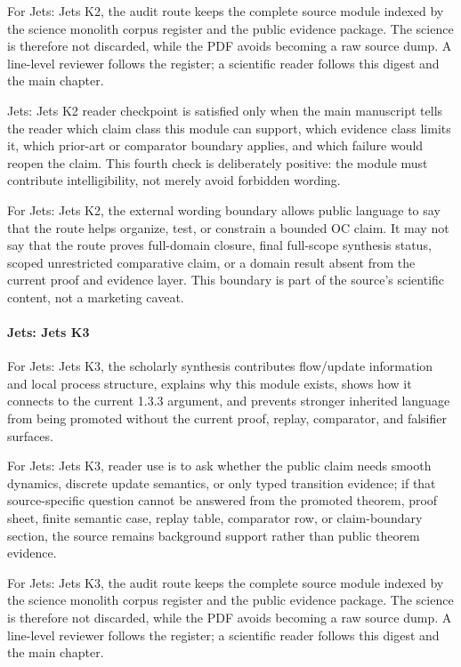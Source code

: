 For Jets: Jets K2, the audit route keeps the complete source module indexed by the science monolith corpus register and the public evidence package. The science is therefore not discarded, while the PDF avoids becoming a raw source dump. A line-level reviewer follows the register; a scientific reader follows this digest and the main chapter.


Jets: Jets K2 reader checkpoint is satisfied only when the main manuscript tells the reader which claim class this module can support, which evidence class limits it, which prior-art or comparator boundary applies, and which failure would reopen the claim. This fourth check is deliberately positive: the module must contribute intelligibility, not merely avoid forbidden wording.


For Jets: Jets K2, the external wording boundary allows public language to say that the route helps organize, test, or constrain a bounded OC claim. It may not say that the route proves full-domain closure, final full-scope synthesis status, scoped unrestricted comparative claim, or a domain result absent from the current proof and evidence layer. This boundary is part of the source's scientific content, not a marketing caveat.


\paragraph{Jets: Jets K3}

For Jets: Jets K3, the scholarly synthesis contributes flow/update information and local process structure, explains why this module exists, shows how it connects to the current 1.3.3 argument, and prevents stronger inherited language from being promoted without the current proof, replay, comparator, and falsifier surfaces.


For Jets: Jets K3, reader use is to ask whether the public claim needs smooth dynamics, discrete update semantics, or only typed transition evidence; if that source-specific question cannot be answered from the promoted theorem, proof sheet, finite semantic case, replay table, comparator row, or claim-boundary section, the source remains background support rather than public theorem evidence.


For Jets: Jets K3, the audit route keeps the complete source module indexed by the science monolith corpus register and the public evidence package. The science is therefore not discarded, while the PDF avoids becoming a raw source dump. A line-level reviewer follows the register; a scientific reader follows this digest and the main chapter.


